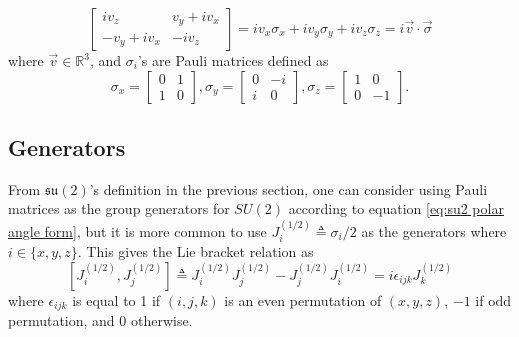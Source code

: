 \documentclass[preprint, 12pt]{revtex4-2}
\numberwithin{equation}{section}
\begin{document}
\begin{equation}\label{eq:su2 polar angle form}
    \begin{bmatrix}
        iv_z & v_y+iv_x \\
        -v_y+iv_x & -iv_z
    \end{bmatrix}
      = iv_x\sigma_x + iv_y\sigma_y + iv_z\sigma_z = i\vec{v}\cdot\vec{\sigma}
\end{equation}
where $\vec{v} \in \mathbb{R}^3$, and $\sigma_i$'s are Pauli matrices defined as
\begin{equation}\label{eq:Pauli's matrices}
    \sigma_x = \begin{bmatrix}
                    0 & 1 \\
                    1 & 0
                \end{bmatrix},
    \sigma_y = \begin{bmatrix}
                    0 & -i \\
                    i & 0
                \end{bmatrix},
    \sigma_z = \begin{bmatrix}
                    1 & 0 \\
                    0 & -1
                \end{bmatrix}.
\end{equation}

\subsection{Generators}
From $\mathfrak{su(2)}$'s definition in the previous section, one can consider using Pauli matrices as the group generators for $SU(2)$ according to equation \ref{eq:su2 polar angle form}, but it is more common to use $J^{(1/2)}_i \triangleq \sigma_i/2$ as the generators where $i\in \{x, y, z\}$. This gives the Lie bracket relation as
\begin{equation} \label{eq:su2 bracket}
    \left[J^{(1/2)}_i, J^{(1/2)}_j\right] \triangleq J^{(1/2)}_iJ^{(1/2)}_j-J^{(1/2)}_jJ^{(1/2)}_i = i\epsilon_{ijk}J^{(1/2)}_k
\end{equation}
where $\epsilon_{ijk}$ is equal to 1 if $(i, j, k)$ is an even permutation of $(x, y, z)$, $-1$ if odd permutation, and 0 otherwise.
\end{document}

